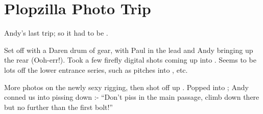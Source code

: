 \section{Plopzilla Photo Trip}


Andy's last trip; so it had to be .

Set off with a Daren drum of gear, with Paul in the lead and Andy
bringing up the rear (Ooh-err!). Took a few firefly digital shots coming
up into . Seems to be lots off the lower 
entrance series, such as pitches into , etc.

More photos on the newly sexy  rigging, then shot off up
. Popped into ; Andy conned us into
pissing down :- ``Don't piss in the main passage, climb down
there but no further than the first bolt!''


